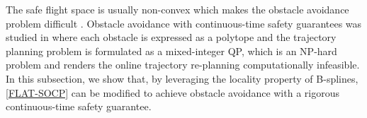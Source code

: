 \documentclass[journal,10pt]{IEEEtran}
\newcommand{\vect}[1]{\boldsymbol{\mathbf{#1}}}
\begin{document}


The safe flight space is usually non-convex which makes the obstacle avoidance problem difficult \cite{tang2021real}. Obstacle avoidance with continuous-time safety guarantees was studied in \cite{stoical2016obstacle} where each obstacle is expressed as a polytope and the trajectory planning problem is formulated as a mixed-integer QP, which is an NP-hard problem and renders the online trajectory re-planning computationally infeasible. In this subsection, we show that, by leveraging the locality property of B-splines, \eqref{FLAT-SOCP} can be modified to achieve obstacle avoidance with a rigorous continuous-time safety guarantee. 



\end{document}
